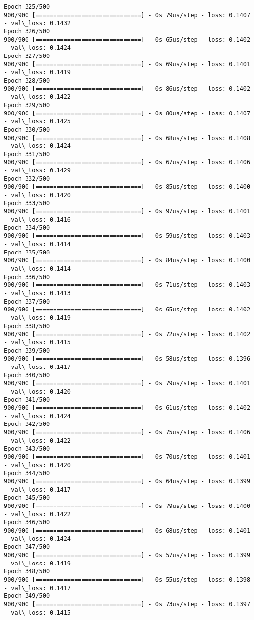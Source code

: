 \documentclass[11pt]{article}
\begin{document}
\begin{Verbatim}[commandchars=\\\{\}]
Epoch 325/500
900/900 [==============================] - 0s 79us/step - loss: 0.1407 - val\_loss: 0.1432
Epoch 326/500
900/900 [==============================] - 0s 65us/step - loss: 0.1402 - val\_loss: 0.1424
Epoch 327/500
900/900 [==============================] - 0s 69us/step - loss: 0.1401 - val\_loss: 0.1419
Epoch 328/500
900/900 [==============================] - 0s 86us/step - loss: 0.1402 - val\_loss: 0.1422
Epoch 329/500
900/900 [==============================] - 0s 80us/step - loss: 0.1407 - val\_loss: 0.1425
Epoch 330/500
900/900 [==============================] - 0s 68us/step - loss: 0.1408 - val\_loss: 0.1424
Epoch 331/500
900/900 [==============================] - 0s 67us/step - loss: 0.1406 - val\_loss: 0.1429
Epoch 332/500
900/900 [==============================] - 0s 85us/step - loss: 0.1400 - val\_loss: 0.1420
Epoch 333/500
900/900 [==============================] - 0s 97us/step - loss: 0.1401 - val\_loss: 0.1416
Epoch 334/500
900/900 [==============================] - 0s 59us/step - loss: 0.1403 - val\_loss: 0.1414
Epoch 335/500
900/900 [==============================] - 0s 84us/step - loss: 0.1400 - val\_loss: 0.1414
Epoch 336/500
900/900 [==============================] - 0s 71us/step - loss: 0.1403 - val\_loss: 0.1413
Epoch 337/500
900/900 [==============================] - 0s 65us/step - loss: 0.1402 - val\_loss: 0.1419
Epoch 338/500
900/900 [==============================] - 0s 72us/step - loss: 0.1402 - val\_loss: 0.1415
Epoch 339/500
900/900 [==============================] - 0s 58us/step - loss: 0.1396 - val\_loss: 0.1417
Epoch 340/500
900/900 [==============================] - 0s 79us/step - loss: 0.1401 - val\_loss: 0.1420
Epoch 341/500
900/900 [==============================] - 0s 61us/step - loss: 0.1402 - val\_loss: 0.1424
Epoch 342/500
900/900 [==============================] - 0s 75us/step - loss: 0.1406 - val\_loss: 0.1422
Epoch 343/500
900/900 [==============================] - 0s 70us/step - loss: 0.1401 - val\_loss: 0.1420
Epoch 344/500
900/900 [==============================] - 0s 64us/step - loss: 0.1399 - val\_loss: 0.1417
Epoch 345/500
900/900 [==============================] - 0s 79us/step - loss: 0.1400 - val\_loss: 0.1422
Epoch 346/500
900/900 [==============================] - 0s 68us/step - loss: 0.1401 - val\_loss: 0.1424
Epoch 347/500
900/900 [==============================] - 0s 57us/step - loss: 0.1399 - val\_loss: 0.1419
Epoch 348/500
900/900 [==============================] - 0s 55us/step - loss: 0.1398 - val\_loss: 0.1417
Epoch 349/500
900/900 [==============================] - 0s 73us/step - loss: 0.1397 - val\_loss: 0.1415

\end{Verbatim}
\end{document}
